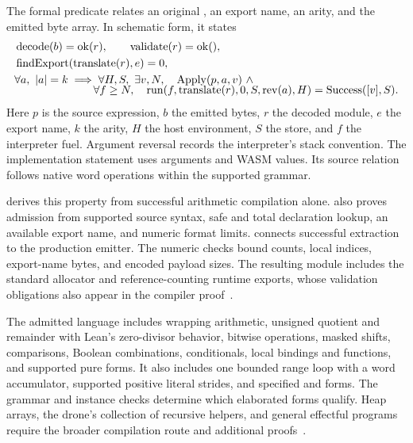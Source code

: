 \documentclass[11pt]{article}
\begin{document}
The formal predicate  relates an original , an export name, an arity, and the emitted byte array.  In schematic form, it states
\begin{align*}
 &\operatorname{decode}(b)=\operatorname{ok}(r),\qquad
   \operatorname{validate}(r)=\operatorname{ok}(),\\
 &\operatorname{findExport}(\operatorname{translate}(r),e)=0,\\
 &\forall a,\ |a|=k\;\Longrightarrow\;\forall H,S,\ \exists v,N,\quad
   \operatorname{Apply}(p,a,v)\ \land\\[-2mm]
 &\hspace{25mm}\forall f\geq N,\quad
   \operatorname{run}(f,\operatorname{translate}(r),0,S,\operatorname{rev}(a),H)
   =\operatorname{Success}([v],S).
\end{align*}
Here $p$ is the source expression, $b$ the emitted bytes, $r$ the decoded module, $e$ the export name, $k$ the arity, $H$ the host environment, $S$ the store, and $f$ the interpreter fuel.  Argument reversal records the interpreter's stack convention.  The implementation statement uses  arguments and WASM  values.  Its source relation follows native word operations within the supported grammar.

 derives this property from successful arithmetic compilation alone.   also proves admission from supported source syntax, safe and total declaration lookup, an available export name, and numeric format limits.   connects successful extraction to the production  emitter.  The numeric checks bound counts, local indices, export-name bytes, and encoded payload sizes.  The resulting module includes the standard allocator and reference-counting runtime exports, whose validation obligations also appear in the compiler proof~\cite{compiler-source,compiler-correctness}.

The admitted language includes wrapping  arithmetic, unsigned quotient and remainder with Lean's zero-divisor behavior, bitwise operations, masked shifts, comparisons, Boolean combinations, conditionals, local bindings and functions, and supported pure  forms.  It also includes one bounded range loop with a word accumulator, supported positive literal strides, and specified  and  forms.  The grammar and instance checks determine which elaborated forms qualify.  Heap arrays, the drone's collection of recursive helpers, and general effectful programs require the broader compilation route and additional proofs~\cite{compiler-correctness}.
\end{document}
